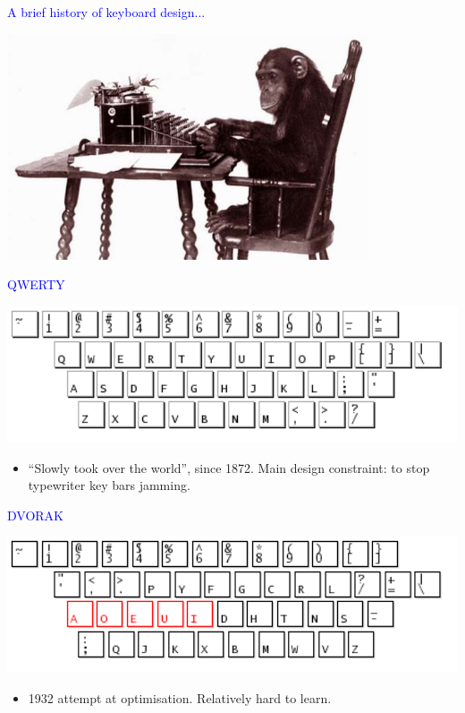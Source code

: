 \documentclass[landscape]{slides}
\begin{document}
\begin{slide}

    \textcolor{blue}{\Large{A brief history of keyboard design...}}

    \centering

    \includegraphics[width=0.8\textwidth]{chimp}

\end{slide}


\begin{slide}

    \textcolor{blue}{\Large{QWERTY}}

    \centering
    \includegraphics[width=20cm]{qwerty}

    \begin{itemize}
        \item ``Slowly took over the world'', since 1872. Main design constraint: to stop typewriter key bars jamming.
    \end{itemize}

\end{slide}


\begin{slide}

    \textcolor{blue}{\Large{DVORAK}}

    \centering
    \includegraphics[width=20cm]{dvorak}

    \begin{itemize}
        \item 1932 attempt at optimisation. Relatively hard to learn.
    \end{itemize}

\end{slide}
\end{document}
